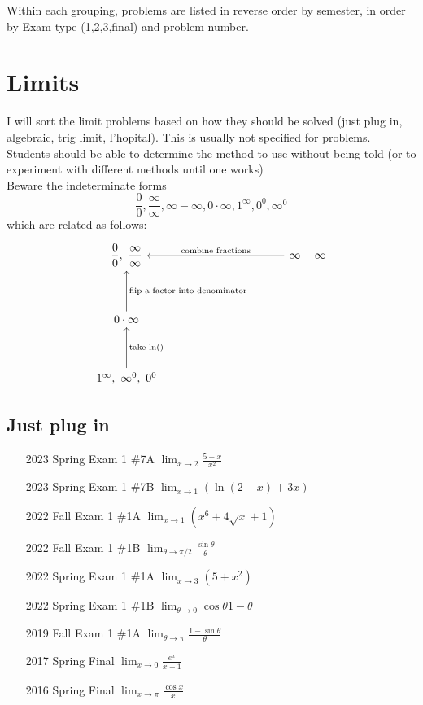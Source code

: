 \documentclass[10pt]{scrartcl}
\theoremstyle{definition}
\begin{document}
Within each grouping, problems are listed in reverse order by semester, in order by Exam type (1,2,3,final) and problem number.

\section{Limits}
I will sort the limit problems based on how they should be solved (just plug in, algebraic, trig limit, l'hopital).
This is usually not specified for problems. \\
Students should be able to determine the method to use without being told (or to experiment with different methods until one works) \\
Beware the indeterminate forms
\[
  \frac 00, \frac\infty\infty, \infty-\infty, 0\cdot\infty, 1^\infty, 0^0, \infty^0
\]
which are related as follows:
\begin{displaymath}
\begin{tikzcd}[column sep=.5in, row sep=.5in]
	{\dfrac00,\ \dfrac\infty\infty} &&& {\infty-\infty} \\%
	0\cdot\infty \\
	{1^\infty,\ \infty^0,\ 0^0}
	\arrow["{\text{combine fractions}}"', from=1-4, to=1-1,anchor=center]
	\arrow["{\text{flip a factor into denominator}}"', from=2-1, to=1-1]
	\arrow["{\text{take ln()}}"', from=3-1, to=2-1]
\end{tikzcd}
\end{displaymath}

\subsection{Just plug in}
\begin{enumerate}
\item [2023 Spring Exam 1 \#7A] $\lim_{x\to2} \frac{5-x}{x^2}$
\item [2023 Spring Exam 1 \#7B] $\lim_{x\to1} (\ln(2-x) + 3x)$
\item [2022 Fall Exam 1 \#1A] $\lim_{x\to1} (x^6 + 4\sqrt x + 1)$
\item [2022 Fall Exam 1 \#1B] $\lim_{\theta\to\pi/2} \frac{\sin \theta}{\theta}$
\item [2022 Spring Exam 1 \#1A] $\lim_{x\to3} (5+x^2)$
\item [2022 Spring Exam 1 \#1B] $\lim_{\theta\to0}{\cos\theta}{1-\theta}$
\item [2019 Fall Exam 1 \#1A] $\lim_{\theta\to\pi} \frac{1-\sin\theta}{\theta}$
\item [2017 Spring Final] $\lim_{x\to0} \frac{e^x}{x+1}$
\item [2016 Spring Final] $\lim_{x\to\pi} \frac{\cos x}{x}$
\end{enumerate}
\end{document}
